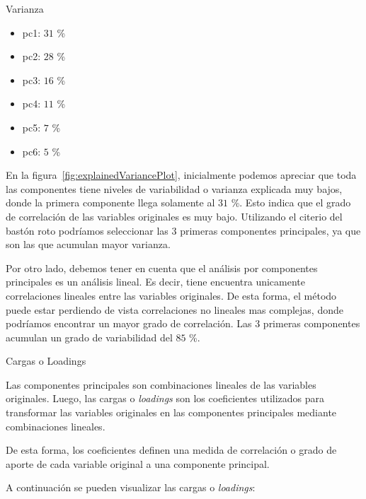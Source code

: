 \documentclass[11pt,a4paper,twoside]{thesis}
\begin{document}
\begin{description}
	\item[Varianza]
\end{description}
\begin{itemize}
	\item pc1: $31$ \%
	\item pc2: $28$ \%
	\item pc3: $16$ \%
	\item pc4: $11$ \%
	\item pc5: $7$ \%
	\item pc6: $5$ \%
\end{itemize}

En la figura~\ref{fig:explainedVariancePlot}, inicialmente podemos apreciar que
toda las componentes tiene niveles de variabilidad o varianza explicada muy
bajos, donde la primera componente llega solamente al $31$ \%. Esto indica que
el grado de correlación de las variables originales es muy bajo. Utilizando el
citerio del bastón roto podríamos seleccionar las 3 primeras componentes
principales, ya que son las que acumulan mayor varianza.

Por otro lado, debemos tener en cuenta que el análisis por componentes
principales es un análisis lineal. Es decir, tiene encuentra unicamente
correlaciones lineales entre las variables originales. De esta forma, el método
puede estar perdiendo de vista correlaciones no lineales mas complejas, donde
podríamos encontrar un mayor grado de correlación. Las 3 primeras componentes
acumulan un grado de variabilidad del $85$ \%.

\begin{description}
	\item[Cargas o Loadings]
\end{description}

Las componentes principales son combinaciones lineales de las variables
originales. Luego, las cargas o \textit{loadings} son los coeficientes
utilizados para transformar las variables originales en las componentes
principales mediante combinaciones lineales.

De esta forma, los coeficientes definen una medida de correlación o grado de
aporte de cada variable original a una componente principal.

A continuación se pueden visualizar las cargas o \textit{loadings}:
\end{document}
